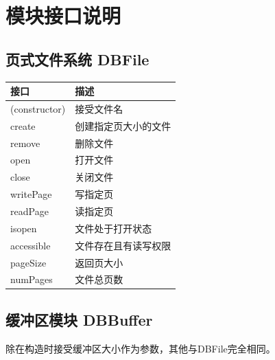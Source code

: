 \section{模块接口说明}
    \subsection{页式文件系统 DBFile}
        \begin{tabularx}{\textwidth}{lX}
            \toprule
            接口 & 描述 \\
            \midrule
            (constructor) & 接受文件名 \\
            \midrule
            create & 创建指定页大小的文件 \\
            \midrule
            remove & 删除文件 \\
            \midrule
            open & 打开文件 \\
            \midrule
            close & 关闭文件 \\
            \midrule
            writePage & 写指定页 \\
            \midrule
            readPage & 读指定页 \\
            \midrule
            isopen & 文件处于打开状态 \\
            \midrule
            accessible & 文件存在且有读写权限 \\
            \midrule
            pageSize & 返回页大小 \\
            \midrule
            numPages & 文件总页数 \\
            \bottomrule
        \end{tabularx}
    \subsection{缓冲区模块 DBBuffer}
        除在构造时接受缓冲区大小作为参数，其他与DBFile完全相同。

